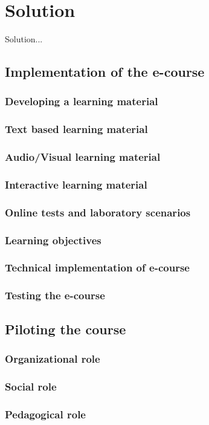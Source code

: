 \chapter{Solution}
\label{solution}
Solution...

\section{Implementation of the e-course}

\subsection{Developing a learning material}
\subsection{Text based learning material}
\subsection{Audio/Visual learning material}
\subsection{Interactive learning material}
\subsection{Online tests and laboratory scenarios}
\subsection{Learning objectives}
\subsection{Technical implementation of e-course}
\subsection{Testing the e-course}
\section{Piloting the course}
\subsection{Organizational role}
\subsection{Social role}
\subsection{Pedagogical role}